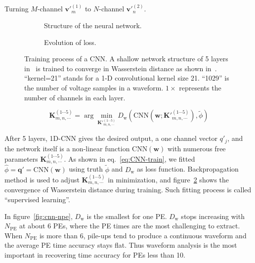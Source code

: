 Turning $M$-channel $\bm{v'}^{(1)}_m$ to $N$-channel $\bm{v'}^{(2)}_n$.

\begin{figure}[H]
  \begin{subfigure}{.4\textwidth}
    \centering
    \begin{adjustbox}{width=0.5\textwidth}
      
    \end{adjustbox}
    \caption{\label{fig:struct} Structure of the neural network.}
  \end{subfigure}
  \begin{subfigure}{.5\textwidth}
    \centering
    \resizebox{\textwidth}{!}{}
    \caption{\label{fig:loss} Evolution of loss.}
  \end{subfigure}
  \caption{\label{fig:CNN} Training process of a CNN. A shallow network structure of 5 layers in~ is trained to converge in Wasserstein distance as shown in~.  ``kernel=21'' stands for a 1-D convolutional kernel size 21. ``1029'' is the number of voltage samples in a waveform.  $1\times$ represents the number of channels in each layer.}
\end{figure}
\vspace{-0.8cm}

\begin{equation}
  \bm{K}^{(1\cdots 5)}_{m,n,\cdots} = \arg\underset{\bm{K'}^{(1\cdots 5)}_{m,n,\cdots}}{\min} D_\mathrm{w}(\mathrm{CNN}(\bm{w}; \bm{K'}^{(1\cdots 5)}_{m,n,\cdots}), \tilde{\phi})
  \label{eq:CNN-train}
\end{equation}

After 5 layers, 1D-CNN gives the desired output, a one channel vector $q'_j$, and the network itself is a non-linear function $\mathrm{CNN}(\bm{w})$ with numerous free parameters $\bm{K}^{(1\cdots5)}_{m,n,\cdots}$. As shown in eq.~\eqref{eq:CNN-train}, we fitted $\hat{\phi}=\bm{q}'=\mathrm{CNN}(\bm{w})$ using truth $\tilde{\phi}$ and $D_\mathrm{w}$ as loss function. Backpropagation method is used to adjust $\bm{K}^{(1\cdots5)}_{m,n,\cdots}$ in minimization, and figure~\ref{fig:loss} shows the convergence of Wasserstein distance during training. Such fitting process is called ``supervised learning''.

In figure~\ref{fig:cnn-npe}, $D_\mathrm{w}$ is the smallest for one PE.  $D_\mathrm{w}$ stops increasing with $N_\mathrm{PE}$ at about 6 PEs, where the PE times are the most challenging to extract.  When $N_\mathrm{PE}$ is more than 6, pile-ups tend to produce a continuous waveform and the average PE time accuracy stays flat. Thus waveform analysis is the most important in recovering time accuracy for PEs less than 10.

